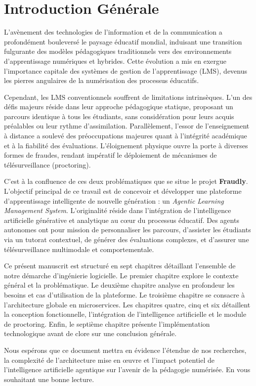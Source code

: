 \chapter*{Introduction Générale}

L'avènement des technologies de l'information et de la communication a profondément bouleversé le paysage éducatif mondial, induisant une transition fulgurante des modèles pédagogiques traditionnels vers des environnements d'apprentissage numériques et hybrides. Cette évolution a mis en exergue l'importance capitale des systèmes de gestion de l'apprentissage (LMS), devenus les pierres angulaires de la numérisation des processus éducatifs.

Cependant, les LMS conventionnels souffrent de limitations intrinsèques. L'un des défis majeurs réside dans leur approche pédagogique statique, proposant un parcours identique à tous les étudiants, sans considération pour leurs acquis préalables ou leur rythme d'assimilation. Parallèlement, l'essor de l'enseignement à distance a soulevé des préoccupations majeures quant à l'intégrité académique et à la fiabilité des évaluations. L'éloignement physique ouvre la porte à diverses formes de fraudes, rendant impératif le déploiement de mécanismes de télésurveillance (proctoring).

C'est à la confluence de ces deux problématiques que se situe le projet \textbf{Fraudly}. L'objectif principal de ce travail est de concevoir et développer une plateforme d'apprentissage intelligente de nouvelle génération : un \textit{Agentic Learning Management System}. L'originalité réside dans l'intégration de l'intelligence artificielle générative et analytique au cœur du processus éducatif. Des agents autonomes ont pour mission de personnaliser les parcours, d'assister les étudiants via un tutorat contextuel, de générer des évaluations complexes, et d'assurer une télésurveillance multimodale et comportementale.

Ce présent manuscrit est structuré en sept chapitres détaillant l'ensemble de notre démarche d'ingénierie logicielle. Le premier chapitre explore le contexte général et la problématique. Le deuxième chapitre analyse en profondeur les besoins et cas d'utilisation de la plateforme. Le troisième chapitre se consacre à l'architecture globale en microservices. Les chapitres quatre, cinq et six détaillent la conception fonctionnelle, l'intégration de l'intelligence artificielle et le module de proctoring. Enfin, le septième chapitre présente l'implémentation technologique avant de clore sur une conclusion générale.


Nous espérons que ce document mettra en évidence l'étendue de nos recherches, la complexité de l'architecture mise en œuvre et l'impact potentiel de l'intelligence artificielle agentique sur l'avenir de la pédagogie numérisée. En vous souhaitant une bonne lecture.